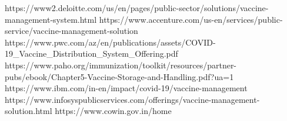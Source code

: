 \documentclass[conference]{IEEEtran}
\begin{document}
\begin{thebibliography}{00}
 https://www2.deloitte.com/us/en/pages/public-sector/solutions/vaccine-management-system.html
 https://www.accenture.com/us-en/services/public-service/vaccine-management-solution
 https://www.pwc.com/az/en/publications/assets/COVID-19\_Vaccine\_Distribution\_System\_Offering.pdf
 https://www.paho.org/immunization/toolkit/resources/partner-pubs/ebook/Chapter5-Vaccine-Storage-and-Handling.pdf?ua=1
 https://www.ibm.com/in-en/impact/covid-19/vaccine-management
 https://www.infosyspublicservices.com/offerings/vaccine-management-solution.html
 https://www.cowin.gov.in/home
\end{thebibliography}
\vspace{16pt}
\end{document}
